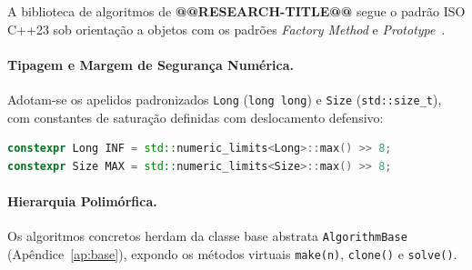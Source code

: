 \documentclass[12pt,a4paper]{article}
\begin{document}
\label{ap:arquitetura}

A biblioteca de algoritmos de \textbf{@@RESEARCH-TITLE@@} segue o padrão ISO C++23 sob orientação a objetos com os padrões \textit{Factory Method} e \textit{Prototype}~\cite{gamma1994design}.

\paragraph{Tipagem e Margem de Segurança Numérica.}
Adotam-se os apelidos padronizados \lstinline{Long} (\lstinline{long long}) e \lstinline{Size} (\lstinline{std::size_t}), com constantes de saturação definidas com deslocamento defensivo:
\begin{lstlisting}[language=C++, numbers=none, basicstyle=\ttfamily\footnotesize, frame=none, backgroundcolor=\color{white}]
constexpr Long INF = std::numeric_limits<Long>::max() >> 8;
constexpr Size MAX = std::numeric_limits<Size>::max() >> 8;
\end{lstlisting}

\paragraph{Hierarquia Polimórfica.}
Os algoritmos concretos herdam da classe base abstrata \lstinline{AlgorithmBase} (Apêndice~\ref{ap:base}), expondo os métodos virtuais \lstinline{make(n)}, \lstinline{clone()} e \lstinline{solve()}.

\newpage

\label{ap:base}
\end{document}
